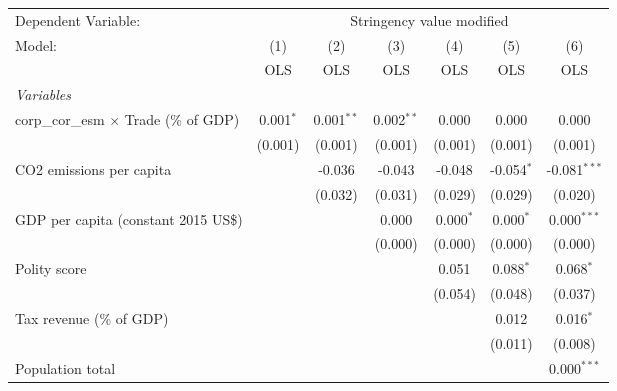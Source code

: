 
\begingroup
\centering
\begin{tabular}{lcccccc}
   \toprule
   Dependent Variable: & \multicolumn{6}{c}{Stringency value modified}\\
   Model:                                        & (1)         & (2)          & (3)          & (4)         & (5)          & (6)\\  
                                                 &  OLS        & OLS          & OLS          & OLS         & OLS          & OLS\\  
   \midrule
   \emph{Variables}\\
   corp\_cor\_esm $\times$ Trade (\% of GDP)     & 0.001$^{*}$ & 0.001$^{**}$ & 0.002$^{**}$ & 0.000       & 0.000        & 0.000\\   
                                                 & (0.001)     & (0.001)      & (0.001)      & (0.001)     & (0.001)      & (0.001)\\   
   CO2 emissions per capita                      &             & -0.036       & -0.043       & -0.048      & -0.054$^{*}$ & -0.081$^{***}$\\   
                                                 &             & (0.032)      & (0.031)      & (0.029)     & (0.029)      & (0.020)\\   
   GDP per capita (constant 2015 US\$)           &             &              & 0.000        & 0.000$^{*}$ & 0.000$^{*}$  & 0.000$^{***}$\\   
                                                 &             &              & (0.000)      & (0.000)     & (0.000)      & (0.000)\\   
   Polity score                                  &             &              &              & 0.051       & 0.088$^{*}$  & 0.068$^{*}$\\   
                                                 &             &              &              & (0.054)     & (0.048)      & (0.037)\\   
   Tax revenue (\% of GDP)                       &             &              &              &             & 0.012        & 0.016$^{*}$\\   
                                                 &             &              &              &             & (0.011)      & (0.008)\\   
   Population total                              &             &              &              &             &              & 0.000$^{***}$\\   

\end{tabular}
